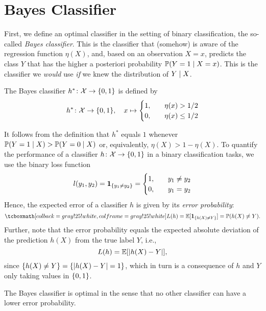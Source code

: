 \section{Bayes Classifier}

First, we define an optimal classifier in the setting of binary classification, the so-called \emph{Bayes classifier}. This is the classifier that (somehow) is aware of the regression function $\eta(X)$, and, based on an observation $X = x$, predicts the class $Y$ that has the higher a posteriori probability $\operatorname{\mathbb{P}}(Y = 1 \mathrel{|} X = x)$. This is the classifier we \emph{would} use \emph{if} we knew the distribution of $Y \mathrel{|} X$.

\begin{definition}
The Bayes classifier $h^* \colon \mathcal{X} \to \set{0,1}$ is defined by
\[
    h^* \colon \mathcal{X} \to \set{0, 1}, \quad x \mapsto \begin{cases}
        1, \quad & \eta(x) > 1/2 \\
        0, \quad & \eta(x) \leq 1/2
    \end{cases}
\]
\end{definition}

It follows from the definition that $h^*$ equals $1$ whenever $\operatorname{\mathbb{P}}(Y = 1 \mathrel{|} X) > \operatorname{\mathbb{P}}(Y = 0 \mathrel{|} X)$ or, equivalently, $\eta(X) > 1 - \eta(X)$. To quantify the performance of a classifier $h \colon \mathcal{X} \to \set{0, 1}$ in a binary classification tasks, we use the binary loss function
\[
    l(y_1, y_2) = \indSet{y_1 \neq y_2} = \begin{cases}
        1, \quad & y_1 \neq y_2 \\
        0, \quad & y_1 = y_2
    \end{cases}
\]
Hence, the expected error of a classifier $h$ is given by its \emph{error probability}:
\[
    \highlightMath{
        L(h) = \Exp[\indSet{h(X) \neq Y}] = \Prob(h(X) \neq Y).
    }
\]
Further, note that the error probability equals the expected absolute deviation of the prediction $h(X)$ from the true label $Y$, i.e.,
\[
    L(h) = \operatorname{\mathbb{E}}[\abs{h(X) - Y}],
\]
since $\set{h(X) \neq Y} = \set{\abs{h(X) - Y} = 1}$, which in turn is a consequence of $h$ and $Y$ only taking values in $\set{0, 1}$.

The Bayes classifier is optimal in the sense that no other classifier can have a lower error probability.

